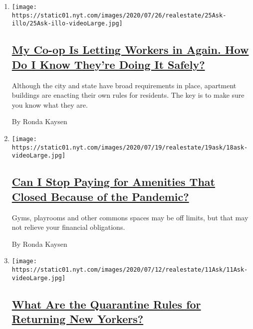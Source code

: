 \begin{enumerate}
\def\labelenumi{\arabic{enumi}.}
\item
  \texttt{[image: https://static01.nyt.com/images/2020/07/26/realestate/25Ask-illo/25Ask-illo-videoLarge.jpg]}

  \hypertarget{my-co-op-is-letting-workers-in-again-how-do-i-know-theyre-doing-it-safely}{%
  \subsection{\texorpdfstring{\href{/2020/07/25/realestate/coronavirus-reopening-workers-in-buildings-rules.html}{My
  Co-op Is Letting Workers in Again. How Do I Know They're Doing It
  Safely?}}{My Co-op Is Letting Workers in Again. How Do I Know They're Doing It Safely?}}\label{my-co-op-is-letting-workers-in-again-how-do-i-know-theyre-doing-it-safely}}

  Although the city and state have broad requirements in place,
  apartment buildings are enacting their own rules for residents. The
  key is to make sure you know what they are.

  By Ronda Kaysen
\item
  \texttt{[image: https://static01.nyt.com/images/2020/07/19/realestate/19ask/18ask-videoLarge.jpg]}

  \hypertarget{can-i-stop-paying-for-amenities-that-closed-because-of-the-pandemic}{%
  \subsection{\texorpdfstring{\href{/2020/07/18/realestate/gym-playroom-fees-coronavirus.html}{Can
  I Stop Paying for Amenities That Closed Because of the
  Pandemic?}}{Can I Stop Paying for Amenities That Closed Because of the Pandemic?}}\label{can-i-stop-paying-for-amenities-that-closed-because-of-the-pandemic}}

  Gyms, playrooms and other commons spaces may be off limits, but that
  may not relieve your financial obligations.

  By Ronda Kaysen
\item
  \texttt{[image: https://static01.nyt.com/images/2020/07/12/realestate/11Ask/11Ask-videoLarge.jpg]}

  \hypertarget{what-are-the-quarantine-rules-for-returning-new-yorkers}{%
  \subsection{\texorpdfstring{\href{/2020/07/11/realestate/what-are-the-quarantine-rules-for-returning-new-yorkers-coronavirus.html}{What
  Are the Quarantine Rules for Returning New
  Yorkers?}}{What Are the Quarantine Rules for Returning New Yorkers?}}\label{what-are-the-quarantine-rules-for-returning-new-yorkers}}


\end{enumerate}
